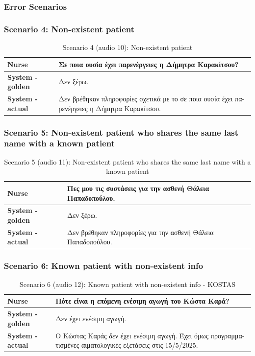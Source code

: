  
\subsubsection{Error Scenarios}
\subsubsection{Scenario 4: Non-existent patient}
\begin{table}[H]
\centering
\renewcommand{\arraystretch}{1.5} 
\begin{tabular}{|>{\bfseries}l|p{11cm}|}
\hline
Nurse & \textgreek{Σε ποια ουσία έχει παρενέργειες η Δήμητρα Καρακίτσου?} \\
\hline
System - golden & \textgreek{Δεν ξέρω.} \\
\hline
System - actual & \textgreek{Δεν βρέθηκαν πληροφορίες σχετικά με το σε ποια ουσία έχει παρενέργειες η Δήμητρα Καρακίτσου.} \\
\hline
\end{tabular}
\caption{Scenario 4 (audio 10): Non-existent patient}
\end{table}

\subsubsection{Scenario 5: Non-existent patient who shares the same last name with a known patient}
\begin{table}[H]
\centering
\renewcommand{\arraystretch}{1.5} 
\begin{tabular}{|>{\bfseries}l|p{11cm}|}
\hline
Nurse & \textgreek{Πες μου τις συστάσεις για την ασθενή Θάλεια Παπαδοπούλου.} \\
\hline
System - golden & \textgreek{Δεν ξέρω.} \\
\hline
System - actual & \textgreek{Δεν βρέθηκαν πληροφορίες για την ασθενή Θάλεια Παπαδοπούλου.} \\
\hline
\end{tabular}
\caption{Scenario 5 (audio 11): Non-existent patient who shares the same last name with a known patient}
\end{table}

\subsubsection{Scenario 6: Known patient with non-existent info}
\begin{table}[H]
\centering
\renewcommand{\arraystretch}{1.5} 
\begin{tabular}{|>{\bfseries}l|p{11cm}|}
\hline
Nurse & \textgreek{Πότε είναι η επόμενη ενέσιμη αγωγή του Κώστα Καρά?} \\
\hline
System - golden & \textgreek{Δεν έχει ενέσιμη αγωγή.} \\
\hline
System - actual & \textgreek{Ο Κώστας Καράς δεν έχει ενέσιμη αγωγή. Έχει όμως προγραμματισμένες αιματολογικές εξετάσεις στις 15/5/2025.} \\
\hline
\end{tabular}
\caption{Scenario 6 (audio 12): Known patient with non-existent info - KOSTAS}
\end{table}

